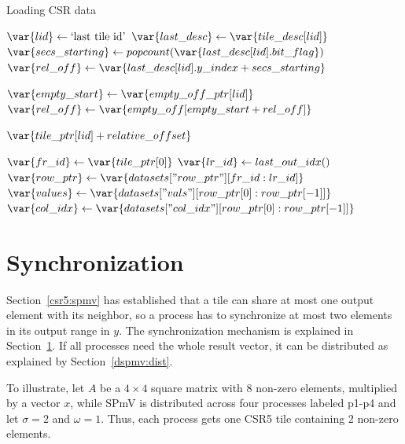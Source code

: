 \documentclass[thesis=M,english]{FITthesis}[2019/12/23]
\begin{document}
\begin{algorithm}
    \caption{Loading CSR data}
    \begin{algorithmic}
        \State \(\var{lid} \gets \text{`last tile id'}\)
        \State \(\var{last\_desc} \gets \var{tile\_desc[lid]}\)
        \State \(\var{secs\_starting} \gets popcount(\var{last\_desc[lid].bit\_flag})\)
        \State \(\var{rel\_off} \gets \var{last\_desc[lid].y\_index + secs\_starting}\)

        \State \(\var{empty\_start} \gets \var{empty\_off\_ptr[lid]}\)
        \State \(\var{rel\_off} \gets \var{empty\_off[empty\_start + rel\_off]}\)
        \EndIf

        \Return \(\var{tile\_ptr[lid] + relative\_offset}\)
        \EndFunction

        \State \(\var{fr\_id} \gets \var{tile\_ptr[0]}\)
        \State \(\var{lr\_id} \gets last\_out\_idx()\)
        \State \(\var{row\_ptr} \gets \var{datasets["row\_ptr"][fr\_id:lr\_id]}\)
        \State \(\var{values} \gets \var{datasets["vals"][row\_ptr[0]: row\_ptr[-1]]}\)
        \State \(\var{col\_idx} \gets \var{datasets["col\_idx"][row\_ptr[0]: row\_ptr[-1]]}\)
        \EndFunction
    \end{algorithmic}
\end{algorithm}

\section{Synchronization}\label{dspmv:sync}

Section~\ref{csr5:spmv} has established that a tile can share at most one output element with its neighbor,
so a process has to synchronize at most two elements in its output range in \(y\). The synchronization
mechanism is explained in Section~\ref{dspmv:sync}. If all processes need the whole result vector,
it can be distributed as explained by Section~\ref{dspmv:dist}.

To illustrate, let \(A\) be a \(4\times4\) square matrix with 8 non-zero elements, multiplied by a vector
\(x\), while SPmV is distributed across four processes labeled p1-p4 and let \(\sigma = 2\) and \(\omega = 1\).
Thus, each process gets one CSR5 tile containing 2 non-zero elements.
\end{document}
